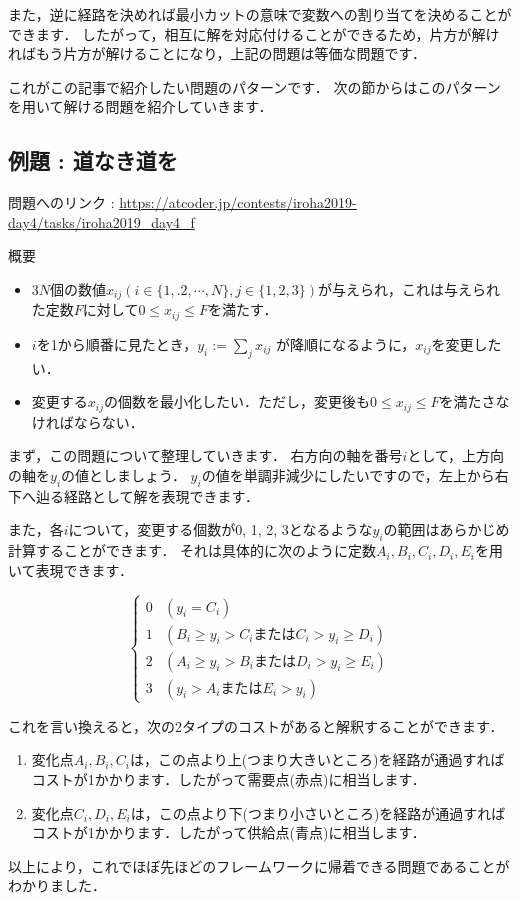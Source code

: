 \documentclass[13pt]{jarticle}
\begin{document}
また，逆に経路を決めれば最小カットの意味で変数への割り当てを決めることができます．
したがって，相互に解を対応付けることができるため，片方が解ければもう片方が解けることになり，上記の問題は等価な問題です．



これがこの記事で紹介したい問題のパターンです．
次の節からはこのパターンを用いて解ける問題を紹介していきます．


\subsection{例題 : 道なき道を}

問題へのリンク : \url{https://atcoder.jp/contests/iroha2019-day4/tasks/iroha2019_day4_f}

概要
\begin{itemize}
\item 3$N$個の数値$x_{ij}(i \in \{1,.2,\cdots ,N\}, j \in \{1,2,3\} )$が与えられ，これは与えられた定数$F$に対して$0 \leq x_{ij} \leq F$を満たす．
\item $i$を1から順番に見たとき，$y_i := \sum_j x_{ij}$ が降順になるように，$x_{ij}$を変更したい．
\item 変更する$x_{ij}$の個数を最小化したい．ただし，変更後も$0 \leq x_{ij} \leq F$を満たさなければならない．
\end{itemize}


まず，この問題について整理していきます．
右方向の軸を番号$i$として，上方向の軸を$y_i$の値としましょう．
$y_i$の値を単調非減少にしたいですので，左上から右下へ辿る経路として解を表現できます．

また，各$i$について，変更する個数が0, 1, 2, 3となるような$y_i$の範囲はあらかじめ計算することができます．
それは具体的に次のように定数$A_i,B_i,C_i,D_i,E_i$を用いて表現できます．

\[
\begin{cases}
0 & (y_i = C_i) \\
1 & (B_i \geq y_i > C_i または C_i > y_i \geq D_i) \\
2 & (A_i \geq y_i > B_i または D_i > y_i \geq E_i) \\
3 & (y_i > A_i または E_i > y_i)
\end{cases}
\]

これを言い換えると，次の2タイプのコストがあると解釈することができます．
\begin{enumerate}
\item 変化点$A_i, B_i, C_i$は，この点より上(つまり大きいところ)を経路が通過すればコストが1かかります．したがって需要点(赤点)に相当します．
\item 変化点$C_i, D_i, E_i$は，この点より下(つまり小さいところ)を経路が通過すればコストが1かかります．したがって供給点(青点)に相当します．
\end{enumerate}
以上により，これでほぼ先ほどのフレームワークに帰着できる問題であることがわかりました．
\end{document}
